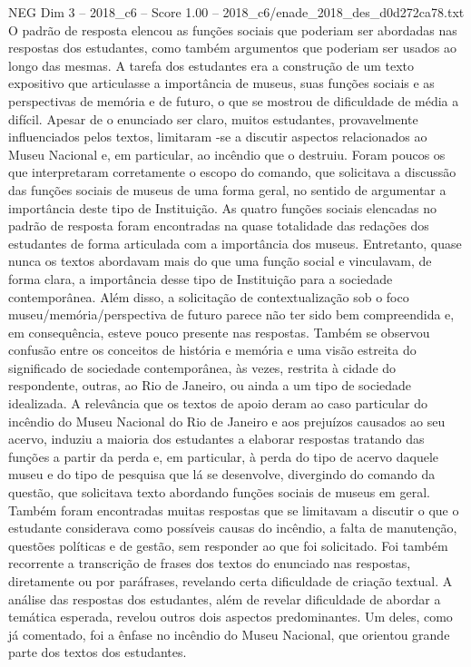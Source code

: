 \begin{textsample}{NEG Dim 3 – 2018\_c6 – Score 1.00 – 2018\_c6/enade\_2018\_des\_d0d272ca78.txt}
O padrão de resposta elencou as funções sociais que poderiam ser abordadas nas respostas dos estudantes, como também argumentos que poderiam ser usados ao longo das mesmas.
A tarefa dos estudantes era a construção de um texto expositivo que articulasse a importância de museus, suas funções sociais e as perspectivas de memória e de futuro, o que se mostrou de dificuldade de média a difícil.
Apesar de o enunciado ser claro, muitos estudantes, provavelmente influenciados pelos textos, limitaram -se a discutir aspectos relacionados ao Museu Nacional e, em particular, ao incêndio que o destruiu.
Foram poucos os que interpretaram corretamente o escopo do comando, que solicitava a discussão das funções sociais de museus de uma forma geral, no sentido de argumentar a importância deste tipo de Instituição.
As quatro funções sociais elencadas no padrão de resposta foram encontradas na quase totalidade das redações dos estudantes de forma articulada com a importância dos museus.
Entretanto, quase nunca os textos abordavam mais do que uma função social e vinculavam, de forma clara, a importância desse tipo de Instituição para a sociedade contemporânea.
Além disso, a solicitação de contextualização sob o foco museu/memória/perspectiva de futuro parece não ter sido bem compreendida e, em consequência, esteve pouco presente nas respostas.
Também se observou confusão entre os conceitos de história e memória e uma visão estreita do significado de sociedade contemporânea, às vezes, restrita à cidade do respondente, outras, ao Rio de Janeiro, ou ainda a um tipo de sociedade idealizada.
A relevância que os textos de apoio deram ao caso particular do incêndio do Museu Nacional do Rio de Janeiro e aos prejuízos causados ao seu acervo, induziu a maioria dos estudantes a elaborar respostas tratando das funções a partir da perda e, em particular, à perda do tipo de acervo daquele museu e do tipo de pesquisa que lá se desenvolve, divergindo do comando da questão, que solicitava texto abordando funções sociais de museus em geral.
Também foram encontradas muitas respostas que se limitavam a discutir o que o estudante considerava como possíveis causas do incêndio, a falta de manutenção, questões políticas e de gestão, sem responder ao que foi solicitado.
Foi também recorrente a transcrição de frases dos textos do enunciado nas respostas, diretamente ou por paráfrases, revelando certa dificuldade de criação textual.
A análise das respostas dos estudantes, além de revelar dificuldade de abordar a temática esperada, revelou outros dois aspectos predominantes.
Um deles, como já comentado, foi a ênfase no incêndio do Museu Nacional, que orientou grande parte dos textos dos estudantes.

\end{textsample}
